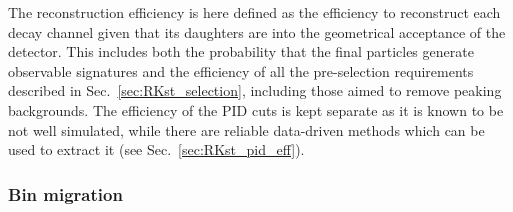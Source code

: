 The reconstruction efficiency is here defined as the efficiency to reconstruct
each decay channel given that its daughters are into the geometrical acceptance
of the detector. This includes both the probability that the final particles generate
observable signatures and the efficiency of all the pre-selection requirements described
in Sec.~\ref{sec:RKst_selection}, including those aimed to remove peaking backgrounds. 
The efficiency of the PID cuts is kept separate as it is known to be not well simulated,
while there are reliable data-driven methods which can be used to extract it (see Sec.~\ref{sec:RKst_pid_eff}).

\subsubsection{Bin migration}

